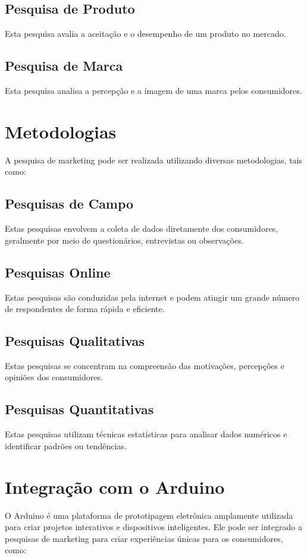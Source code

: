 \documentclass{ufersa}
\begin{document}
\subsection{Pesquisa de Produto}
Esta pesquisa avalia a aceitação e o desempenho de um produto no mercado.

\subsection{Pesquisa de Marca}
Esta pesquisa analisa a percepção e a imagem de uma marca pelos consumidores.

\section{Metodologias}
A pesquisa de marketing pode ser realizada utilizando diversas metodologias, tais como:

\subsection{Pesquisas de Campo}
Estas pesquisas envolvem a coleta de dados diretamente dos consumidores, geralmente por meio de questionários, entrevistas ou observações.

\subsection{Pesquisas Online}
Estas pesquisas são conduzidas pela internet e podem atingir um grande número de respondentes de forma rápida e eficiente.

\subsection{Pesquisas Qualitativas}
Estas pesquisas se concentram na compreensão das motivações, percepções e opiniões dos consumidores.

\subsection{Pesquisas Quantitativas}
Estas pesquisas utilizam técnicas estatísticas para analisar dados numéricos e identificar padrões ou tendências.

\section{Integração com o Arduino}
O Arduino é uma plataforma de prototipagem eletrônica amplamente utilizada para criar projetos interativos e dispositivos inteligentes. Ele pode ser integrado a pesquisas de marketing para criar experiências únicas para os consumidores, como:
\end{document}
